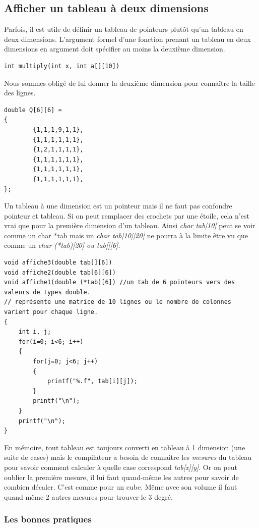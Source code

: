 \documentclass[12pt]{article}
\begin{document}
\subsection{Afficher un tableau à deux dimensions}
Parfois, il est utile de définir un tableau de pointeurs plutôt qu’un tableau en deux dimensions. L’argument formel d’une fonction prenant un tableau en deux dimensions en argument doit spécifier au moins la deuxième dimension. 
\begin{lstlisting}
int multiply(int x, int a[][10])
\end{lstlisting}
Nous sommes obligé de lui donner la deuxième dimension pour connaître la taille des lignes.
\begin{lstlisting}
double Q[6][6] = 
{
        {1,1,1,9,1,1},
        {1,1,1,1,1,1},
        {1,2,1,1,1,1},
        {1,1,1,1,1,1},
        {1,1,1,1,1,1},
        {1,1,1,1,1,1},
};
\end{lstlisting}
Un tableau à une dimension est un pointeur mais il ne faut pas confondre pointeur et tableau. Si on peut remplacer des crochets par une étoile, cela n'est vrai que pour la première dimension d'un tableau.
Ainsi \emph{char tab[10]} peut se voir comme un char *tab mais un \emph{char tab[10][20]} ne pourra à la limite être vu que comme un \emph{char (*tab)[20] ou tab[][6]}.
\begin{lstlisting}
void affiche3(double tab[][6])
void affiche2(double tab[6][6])
void affiche1(double (*tab)[6]) //un tab de 6 pointeurs vers des valeurs de types double.
// représente une matrice de 10 lignes ou le nombre de colonnes varient pour chaque ligne.
{
    int i, j;
    for(i=0; i<6; i++)
    {
        for(j=0; j<6; j++)
        {
            printf("%.f", tab[i][j]);
        }
        printf("\n");
    }
    printf("\n");
}
\end{lstlisting}

En mémoire, tout tableau est toujours converti en tableau à 1 dimension (une suite de cases) mais le compilateur a besoin de connaitre les \emph{mesures} du tableau pour savoir comment calculer à quelle case correspond \emph{tab[x][y]}. Or on peut oublier la première mesure, il lui faut quand-même les autres pour savoir de combien décaler. 
C'est comme pour un cube. Même avec son volume il faut quand-même 2 autres mesures pour trouver le 3 degré.


\subsubsection{Les bonnes pratiques}
\end{document}
